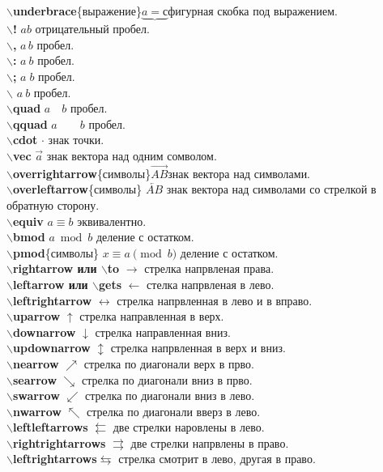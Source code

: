 \documentclass{article}
\newcommand{\bs}{$\backslash$}
\newcommand{\bd}[1]{{\bfseries #1}} %
\newcommand{\bb}[1]{\bd{\bs #1}} %
\begin{document}
\bb{underbrace}\{выражение\}$\underbrace{a=с}$фигурная скобка под выражением.\\
\bb{!} $a\! b$ отрицательный пробел.\\
\bb{,} $a\, b$ пробел.\\
\bb{:} $a\: b$ пробел.\\
\bb{;} $a\; b$ пробел.\\
\bb{} $a\ b$ пробел.\\
\bb{quad} $a\quad b$ пробел.\\
\bb{qquad} $a\qquad b$ пробел.\\
\bb{cdot} $\cdot$ знак точки.\\
\bb{vec} $\vec a$ знак вектора над одним сомволом.\\
\bb{overrightarrow}\{символы\}$\overrightarrow{AB}$знак вектора над символами.\\
\bb{overleftarrow}\{символы\} $\overleftarrow{AB}$ знак вектора над символами
со стрелкой в обратную сторону.\\
\bb{equiv} $a\equiv b$ эквивалентно.\\
\bb{bmod} $a \bmod b$ деление с остатком.\\
\bb{pmod}\{символы\} $x \equiv a \pmod{b}$ деление с остатком.\\
\bb{rightarrow или \bs to} $\rightarrow$ стрелка напрвленая права.\\
\bb{leftarrow или \bs gets} $\leftarrow$ стелка напрвленая в лево.\\
\bb{leftrightarrow} $\leftrightarrow$ стрелка напрвленная в лево и в вправо.\\
\bb{uparrow} $\uparrow$ стрелка направленная в верх.\\
\bb{downarrow} $\downarrow$ стрелка направленная вниз.\\
\bb{updownarrow} $\updownarrow$ стрелка напрвленная в верх и вниз.\\
\bb{nearrow} $\nearrow$ стрелка  по диагонали верх в прво.\\
\bb{searrow} $\searrow$ стрелка по диагонали вниз в прво.\\
\bb{swarrow} $\swarrow$ стрелка по диагонали вниз в лево.\\
\bb{nwarrow} $\nwarrow$ стрелка по диагонали вверз в лево.\\
\bb{leftleftarrows} $\leftleftarrows$ две стрелки наровлены в лево.\\
\bb{rightrightarrows} $\rightrightarrows$ две стрелки напрвлены в право.\\
\bb{leftrightarrows}$\leftrightarrows$ стрелка смотрит в лево, другая в право.\\
\end{document}
